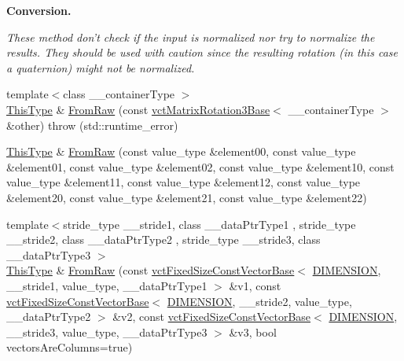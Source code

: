 \begin{Indent}{\bf Conversion.}\par
{\em These method don't check if the input is normalized nor try to normalize the results. They should be used with caution since the resulting rotation (in this case a quaternion) might not be normalized. }\begin{DoxyCompactItemize}
\item 
{\footnotesize template$<$class \-\_\-\-\_\-container\-Type $>$ }\\\hyperlink{classvct_matrix_rotation3_base_a027be766cb10ca3c2ad8e85c28ed0af9}{This\-Type} \& \hyperlink{classvct_matrix_rotation3_base_a0948db2e0ad2ee1f27a2fdc3c3a7b8e1}{From\-Raw} (const \hyperlink{classvct_matrix_rotation3_base}{vct\-Matrix\-Rotation3\-Base}$<$ \-\_\-\-\_\-container\-Type $>$ \&other)  throw (std\-::runtime\-\_\-error)
\item 
\hyperlink{classvct_matrix_rotation3_base_a027be766cb10ca3c2ad8e85c28ed0af9}{This\-Type} \& \hyperlink{classvct_matrix_rotation3_base_a016b4c79b3e13e79c1e1608a0a921117}{From\-Raw} (const value\-\_\-type \&element00, const value\-\_\-type \&element01, const value\-\_\-type \&element02, const value\-\_\-type \&element10, const value\-\_\-type \&element11, const value\-\_\-type \&element12, const value\-\_\-type \&element20, const value\-\_\-type \&element21, const value\-\_\-type \&element22)
\item 
{\footnotesize template$<$stride\-\_\-type \-\_\-\-\_\-stride1, class \-\_\-\-\_\-data\-Ptr\-Type1 , stride\-\_\-type \-\_\-\-\_\-stride2, class \-\_\-\-\_\-data\-Ptr\-Type2 , stride\-\_\-type \-\_\-\-\_\-stride3, class \-\_\-\-\_\-data\-Ptr\-Type3 $>$ }\\\hyperlink{classvct_matrix_rotation3_base_a027be766cb10ca3c2ad8e85c28ed0af9}{This\-Type} \& \hyperlink{classvct_matrix_rotation3_base_ac62edf48bdbb7fe36c2b2c54d0a5001b}{From\-Raw} (const \hyperlink{classvct_fixed_size_const_vector_base}{vct\-Fixed\-Size\-Const\-Vector\-Base}$<$ \hyperlink{classvct_matrix_rotation3_base_a97514c086bdd3a691714817775b02f21a43f9b5ba9769ee62eadd8398853504cd}{D\-I\-M\-E\-N\-S\-I\-O\-N}, \-\_\-\-\_\-stride1, value\-\_\-type, \-\_\-\-\_\-data\-Ptr\-Type1 $>$ \&v1, const \hyperlink{classvct_fixed_size_const_vector_base}{vct\-Fixed\-Size\-Const\-Vector\-Base}$<$ \hyperlink{classvct_matrix_rotation3_base_a97514c086bdd3a691714817775b02f21a43f9b5ba9769ee62eadd8398853504cd}{D\-I\-M\-E\-N\-S\-I\-O\-N}, \-\_\-\-\_\-stride2, value\-\_\-type, \-\_\-\-\_\-data\-Ptr\-Type2 $>$ \&v2, const \hyperlink{classvct_fixed_size_const_vector_base}{vct\-Fixed\-Size\-Const\-Vector\-Base}$<$ \hyperlink{classvct_matrix_rotation3_base_a97514c086bdd3a691714817775b02f21a43f9b5ba9769ee62eadd8398853504cd}{D\-I\-M\-E\-N\-S\-I\-O\-N}, \-\_\-\-\_\-stride3, value\-\_\-type, \-\_\-\-\_\-data\-Ptr\-Type3 $>$ \&v3, bool vectors\-Are\-Columns=true)

\end{DoxyCompactItemize}
\end{Indent}
